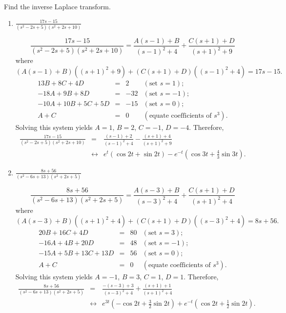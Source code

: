 \documentclass{ximera}
\begin{document}
\begin{problem}\label{exer:8.2.6}
 Find the inverse Laplace transform.

\begin{enumerate}
    \item $\frac{17 s-15}{(s^2-2s+5)(s^2+2s+10)}$

\begin{solution}
$$
\frac{17s-15}{(s^2-2s+5)(s^2+2s+10)}
=\frac{A(s-1)+B}{(s-1)^2+4}+\frac{C(s+1)+D}{(s+1)^2+9}
$$
where
$$
(A(s-1)+B)((s+1)^2+9)+(C(s+1)+D)((s-1)^2+4)=17 s-15.
$$
$$
\begin{array}{rcrl}
13B+8C+4D&=&2&(\mbox{set }s=1);\\
-18A+9B+8D&=&-32& (\mbox{set }s=-1);\\
-10A+10B+5C+5D&=&-15&(\mbox{set }s=0);\\
A+C&=&0&(\mbox{equate coefficients of }s^3).
\end{array}
$$
Solving this system yields $A=1$, $B=2$,
$C=-1$, $D=-4$. Therefore,
\begin{eqnarray*}
\frac{17s-15}{(s^2-2s+5)(s^2+2s+10)}
&=&
\frac{(s-1)+2}{(s-1)^2+4}-\frac{(s+1)+4}{(s+1)^2+9}
\\&\leftrightarrow&
 e^t(\cos 2t+\sin 2t)-e^{-t}\left(\cos
3t+\frac{4}{3}\sin 3t\right).
\end{eqnarray*}
\end{solution}

    \item $\frac{8s+56}{(s^2-6s+13)(s^2+2s+5)}$

\begin{solution}
$$\frac{8s+56}{(s^2-6s+13)(s^2+2s+5)}
=\frac{A(s-3)+B}{(s-3)^2+4}+\frac{C(s+1)+D}{(s+1)^2+4}
$$
where
$$
(A(s-3)+B)((s+1)^2+4)+(C(s+1)+D)((s-3)^2+4)=8s+56.
$$
$$
\begin{array}{rcrl}
20B+16C+4D&=&80&(\mbox{set }s=3);\\
-16A+4B+20D&=&48& (\mbox{set }s=-1);\\
-15A+5B+13C+13D&=&56&(\mbox{set }s=0);\\
A+C&=&0&(\mbox{equate coefficients of }s^3).
\end{array}
$$
Solving this system yields $A=-1$, $B=3$,
$C=1$, $D=1$. Therefore,
\begin{eqnarray*}
\frac{8s+56}{(s^2-6s+13)(s^2+2s+5)}
&=&\frac{-(s-3)+3}{(s-3)^2+4}+\frac{(s+1)+1}{(s+1)^2+4}
\\&\leftrightarrow&
{e^{3t}\left(-\cos 2t+\frac{3}{2}\sin
2t\right)+e^{-t}\left(\cos 2t+\frac{1}{2}\sin 2t\right)}.
\end{eqnarray*}
\end{solution}


\end{enumerate}
\end{problem}
\end{document}
